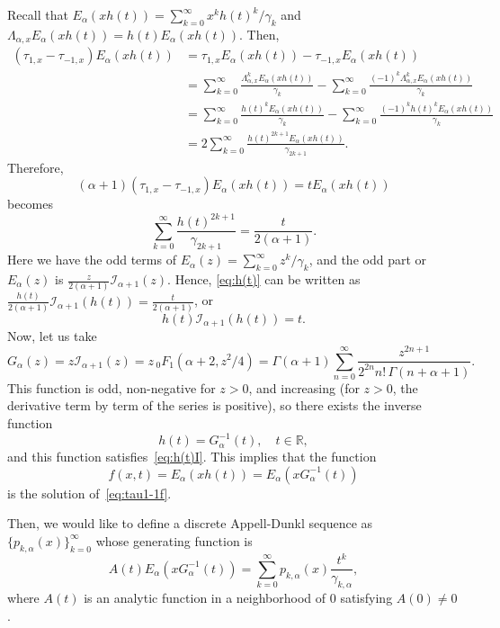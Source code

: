 \documentclass[11pt]{article}
\theoremstyle{plain}
\theoremstyle{remark}
\numberwithin{equation}{section} %
\newcommand{\Ea}{E_{\alpha}}
\newcommand{\Lax}{\Lambda_{\alpha,x}}
\newcommand{\I}{\mathcal{I}}
\newcommand{\RR}{\mathbb{R}}
\newcommand{\cc}{\gamma}
\begin{document}
Recall that $\Ea(x h(t)) = \sum_{k=0}^{\infty} x^k h(t)^k/\cc_k$ and
$\Lax \Ea(x h(t)) = h(t) \Ea(x h(t))$. Then,
\begin{equation}
\label{eq:E(h(t))}
\begin{aligned} %
  (\tau_{1,x}-\tau_{-1,x}) \Ea(x h(t)) 
  &= \tau_{1,x} \Ea(x h(t)) - \tau_{-1,x} \Ea(x h(t)) \\
  &= \sum_{k=0}^{\infty} \frac{\Lax^k \Ea(x h(t))}{\cc_k}
  - \sum_{k=0}^{\infty} \frac{(-1)^k \Lax^k \Ea(x h(t))}{\cc_k} \\
  &= \sum_{k=0}^{\infty} \frac{h(t)^k \Ea(x h(t))}{\cc_k}
  - \sum_{k=0}^{\infty} \frac{(-1)^k h(t)^k \Ea(x h(t))}{\cc_k} \\
  &= 2 \sum_{k=0}^{\infty} \frac{h(t)^{2k+1} \Ea(x h(t))}{\cc_{2k+1}}.
\end{aligned}
\end{equation}
Therefore,
\[
  (\alpha+1)(\tau_{1,x}-\tau_{-1,x}) \Ea(x h(t)) = t \Ea(x h(t))
\]
becomes
\begin{equation}
\label{eq:h(t)}
  \sum_{k=0}^{\infty} \frac{h(t)^{2k+1}}{\cc_{2k+1}} = \frac{t}{2(\alpha+1)}.
\end{equation}
Here we have the odd terms of $\Ea(z) = \sum_{k=0}^{\infty} z^k/\cc_k$, and the odd part or $\Ea(z)$ is $\frac{z}{2(\alpha+1)}\I_{\alpha+1}(z)$.
Hence, \eqref{eq:h(t)} can be written as
$\frac{h(t)}{2(\alpha+1)}\I_{\alpha+1}(h(t)) = \frac{t}{2(\alpha+1)}$, or 
\begin{equation}
\label{eq:h(t)I}
h(t)\I_{\alpha+1}(h(t)) = t.
\end{equation}
Now, let us take 
\[
  G_{\alpha}(z) = z \I_{\alpha+1}(z) = z \,{}_0F_1(\alpha+2,z^2/4)
  = \Gamma(\alpha+1) \sum_{n=0}^\infty \frac{z^{2n+1}}{2^{2n} n!\,\Gamma(n+\alpha+1)}.
\]
This function is odd, non-negative for $z>0$, and increasing (for $z>0$, the derivative term by term of the series is positive),
so there exists the inverse function
\[
  h(t) = G_{\alpha}^{-1}(t), \quad t \in \RR,
\]
and this function satisfies~\eqref{eq:h(t)I}. 
This implies that the function 
\[
  f(x,t) = \Ea(x h(t)) = \Ea(x G_{\alpha}^{-1}(t))
\]
is the solution of~\eqref{eq:tau1-1f}.

Then, we would like to define a discrete Appell-Dunkl sequence as $\{p_{k,\alpha}(x)\}_{k=0}^{\infty}$ whose generating function is
\begin{equation}
\label{eq:defADd}
  A(t) \Ea(x G_{\alpha}^{-1}(t)) = \sum_{k=0}^{\infty} p_{k,\alpha}(x) \frac{t^k}{\cc_{k,\alpha}},
\end{equation}
where $A(t)$ is an analytic function in a neighborhood of $0$ satisfying $A(0) \ne 0$.
\end{document}

